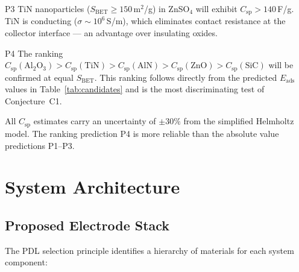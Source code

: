 \documentclass[11pt,a4paper]{article}
\newcommand{\Eads}{E_{\mathrm{ads}}}
\newcommand{\egeom}{\varepsilon_{\mathrm{geom}}}
\newcommand{\Csp}{C_{\mathrm{sp}}}
\newcommand{\SBET}{S_{\mathrm{BET}}}
\begin{document}
\begin{prediction}{P3}
TiN nanoparticles ($\SBET \geq 150$\,m$^2$/g) in ZnSO$_4$ will exhibit $\Csp > 140$\,F/g. TiN is conducting ($\sigma \sim 10^6$\,S/m), which eliminates contact resistance at the collector interface — an advantage over insulating oxides.
\end{prediction}

\begin{prediction}{P4}
The ranking $\Csp(\text{Al}_2\text{O}_3) > \Csp(\text{TiN}) > \Csp(\text{AlN}) > \Csp(\text{ZnO}) > \Csp(\text{SiC})$ will be confirmed at equal $\SBET$. This ranking follows directly from the predicted $\Eads$ values in Table~\ref{tab:candidates} and is the most discriminating test of Conjecture~C1.
\end{prediction}

\begin{remark}
All $\Csp$ estimates carry an uncertainty of $\pm 30\%$ from the simplified Helmholtz model. The ranking prediction P4 is more reliable than the absolute value predictions P1--P3.
\end{remark}

\section{System Architecture}
\label{sec:design}

\subsection{Proposed Electrode Stack}

The PDL selection principle identifies a hierarchy of materials for each system component:

\begin{center}
\end{center}
\end{document}
